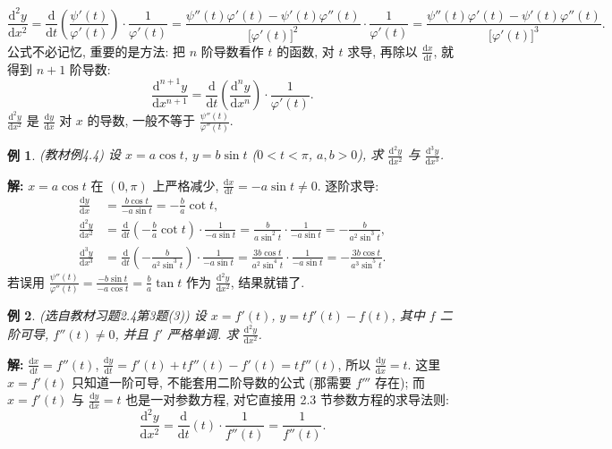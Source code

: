 \documentclass[UTF8,openany]{ctexbook}
\theoremstyle{chinesetextbook}
\newtheorem{example}{例}[section]
\newenvironment{cnsolution}{\par\indent\textbf{解:} \ignorespaces}{\par}
\newcommand{\dd}{\mathrm d}
\begin{document}
\[
\frac{\dd^2y}{\dd x^2}=\frac{\dd}{\dd t}\left(\frac{\psi'(t)}{\varphi'(t)}\right)\cdot\frac1{\varphi'(t)}=\frac{\psi''(t)\varphi'(t)-\psi'(t)\varphi''(t)}{\bigl[\varphi'(t)\bigr]^2}\cdot\frac1{\varphi'(t)}=\frac{\psi''(t)\varphi'(t)-\psi'(t)\varphi''(t)}{\bigl[\varphi'(t)\bigr]^3}.
\]
公式不必记忆, 重要的是方法: 把 $n$ 阶导数看作 $t$ 的函数, 对 $t$ 求导, 再除以 $\displaystyle\frac{\dd x}{\dd t}$, 就得到 $n+1$ 阶导数:
\[
\frac{\dd^{n+1}y}{\dd x^{n+1}}=\frac{\dd}{\dd t}\left(\frac{\dd^ny}{\dd x^n}\right)\cdot\frac1{\varphi'(t)}.
\]
$\displaystyle\frac{\dd^2y}{\dd x^2}$ 是 $\displaystyle\frac{\dd y}{\dd x}$ 对 $x$ 的导数, 一般不等于 $\displaystyle\frac{\psi''(t)}{\varphi''(t)}$.
\begin{example}\label{ex:c2-4-4}
\textnormal{(教材例4.4)} 设 $x=a\cos t$, $y=b\sin t$ ($0<t<\pi$, $a,b>0$), 求 $\displaystyle\frac{\dd^2y}{\dd x^2}$ 与 $\displaystyle\frac{\dd^3y}{\dd x^3}$.
\end{example}
\begin{cnsolution}
$x=a\cos t$ 在 $(0,\pi)$ 上严格减少, $\displaystyle\frac{\dd x}{\dd t}=-a\sin t\ne0$. 逐阶求导:
\[
\begin{aligned}
\frac{\dd y}{\dd x}&=\frac{b\cos t}{-a\sin t}=-\frac ba\cot t,\\
\frac{\dd^2y}{\dd x^2}&=\frac{\dd}{\dd t}\left(-\frac ba\cot t\right)\cdot\frac1{-a\sin t}=\frac b{a\sin^2t}\cdot\frac1{-a\sin t}=-\frac b{a^2\sin^3t},\\
\frac{\dd^3y}{\dd x^3}&=\frac{\dd}{\dd t}\left(-\frac b{a^2\sin^3t}\right)\cdot\frac1{-a\sin t}=\frac{3b\cos t}{a^2\sin^4t}\cdot\frac1{-a\sin t}=-\frac{3b\cos t}{a^3\sin^5t}.
\end{aligned}
\]
若误用 $\displaystyle\frac{\psi''(t)}{\varphi''(t)}=\frac{-b\sin t}{-a\cos t}=\frac ba\tan t$ 作为 $\displaystyle\frac{\dd^2y}{\dd x^2}$, 结果就错了.
\end{cnsolution}
\begin{example}\label{ex:c2-h4-3}
\textnormal{(选自教材习题2.4第3题(3))} 设 $x=f'(t)$, $y=tf'(t)-f(t)$, 其中 $f$ 二阶可导, $f''(t)\ne0$, 并且 $f'$ 严格单调. 求 $\displaystyle\frac{\dd^2y}{\dd x^2}$.
\end{example}
\begin{cnsolution}
$\displaystyle\frac{\dd x}{\dd t}=f''(t)$, $\displaystyle\frac{\dd y}{\dd t}=f'(t)+tf''(t)-f'(t)=tf''(t)$, 所以 $\displaystyle\frac{\dd y}{\dd x}=t$. 这里 $x=f'(t)$ 只知道一阶可导, 不能套用二阶导数的公式 (那需要 $f'''$ 存在); 而 $x=f'(t)$ 与 $\displaystyle\frac{\dd y}{\dd x}=t$ 也是一对参数方程, 对它直接用 2.3 节参数方程的求导法则:
\[
\frac{\dd^2y}{\dd x^2}=\frac{\dd}{\dd t}(t)\cdot\frac1{f''(t)}=\frac1{f''(t)}.
\]
\end{cnsolution}
\end{document}
